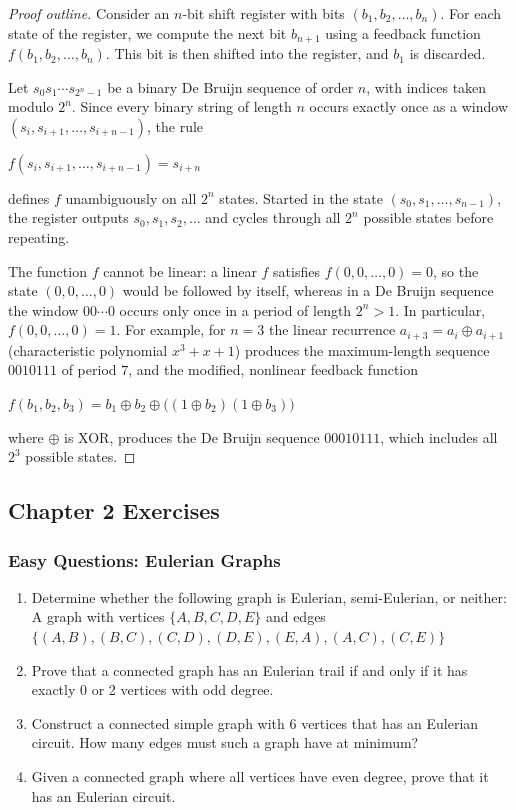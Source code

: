 \documentclass{article}
\theoremstyle{definition}
\begin{document}
\begin{proof}[Proof outline]
Consider an $n$-bit shift register with bits $(b_1, b_2, \ldots, b_n)$. For each state of the register, we compute the next bit $b_{n+1}$ using a feedback function $f(b_1, b_2, \ldots, b_n)$. This bit is then shifted into the register, and $b_1$ is discarded.

Let $s_0 s_1 \cdots s_{2^n-1}$ be a binary De Bruijn sequence of order $n$, with indices taken modulo $2^n$. Since every binary string of length $n$ occurs exactly once as a window $(s_i, s_{i+1}, \ldots, s_{i+n-1})$, the rule
\begin{center}
$f(s_i, s_{i+1}, \ldots, s_{i+n-1}) = s_{i+n}$
\end{center}
defines $f$ unambiguously on all $2^n$ states. Started in the state $(s_0, s_1, \ldots, s_{n-1})$, the register outputs $s_0, s_1, s_2, \ldots$ and cycles through all $2^n$ possible states before repeating.

The function $f$ cannot be linear: a linear $f$ satisfies $f(0, 0, \ldots, 0) = 0$, so the state $(0, 0, \ldots, 0)$ would be followed by itself, whereas in a De Bruijn sequence the window $0 0 \cdots 0$ occurs only once in a period of length $2^n > 1$. In particular, $f(0, 0, \ldots, 0) = 1$. For example, for $n = 3$ the linear recurrence $a_{i+3} = a_i \oplus a_{i+1}$ (characteristic polynomial $x^3 + x + 1$) produces the maximum-length sequence $0010111$ of period $7$, and the modified, nonlinear feedback function
\begin{center}
$f(b_1, b_2, b_3) = b_1 \oplus b_2 \oplus \big((1 \oplus b_2)(1 \oplus b_3)\big)$
\end{center}
where $\oplus$ is XOR, produces the De Bruijn sequence $00010111$, which includes all $2^3$ possible states.
\end{proof}
\pagebreak
\pagebreak
\clearpage
\subsection{Chapter 2 Exercises}
\subsubsection{Easy Questions: Eulerian Graphs}
\begin{enumerate}
    \item Determine whether the following graph is Eulerian, semi-Eulerian, or neither:
    A graph with vertices $\{A, B, C, D, E\}$ and edges $\{(A,B), (B,C), (C,D), (D,E), (E,A), (A,C), (C,E)\}$
    
    \item Prove that a connected graph has an Eulerian trail if and only if it has exactly 0 or 2 vertices with odd degree.
    
    \item Construct a connected simple graph with 6 vertices that has an Eulerian circuit. How many edges must such a graph have at minimum?
    
    \item Given a connected graph where all vertices have even degree, prove that it has an Eulerian circuit.

    
\end{enumerate}
\end{document}
